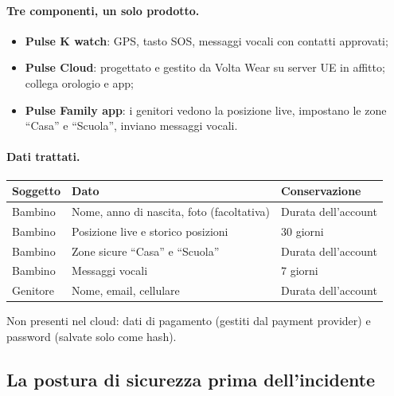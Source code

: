 \paragraph{Tre componenti, un solo prodotto.}
\begin{itemize}
  \item \textbf{Pulse K watch}: GPS, tasto SOS, messaggi vocali con contatti approvati;
  \item \textbf{Pulse Cloud}: progettato e gestito da Volta Wear su server UE in affitto; collega
    orologio e app;
  \item \textbf{Pulse Family app}: i genitori vedono la posizione live, impostano le zone ``Casa''
    e ``Scuola'', inviano messaggi vocali.
\end{itemize}

\paragraph{Dati trattati.}
\begin{center}
\begin{tabularx}{0.9\linewidth}{lXl}
\toprule
\textbf{Soggetto} & \textbf{Dato} & \textbf{Conservazione} \\ \midrule
Bambino  & Nome, anno di nascita, foto (facoltativa) & Durata dell'account \\
Bambino  & Posizione live e storico posizioni        & 30 giorni \\
Bambino  & Zone sicure ``Casa'' e ``Scuola''         & Durata dell'account \\
Bambino  & Messaggi vocali                           & 7 giorni \\
Genitore & Nome, email, cellulare                    & Durata dell'account \\ \bottomrule
\end{tabularx}
\end{center}
Non presenti nel cloud: dati di pagamento (gestiti dal payment provider) e password (salvate solo
come hash).

\subsection{La postura di sicurezza prima dell'incidente}

